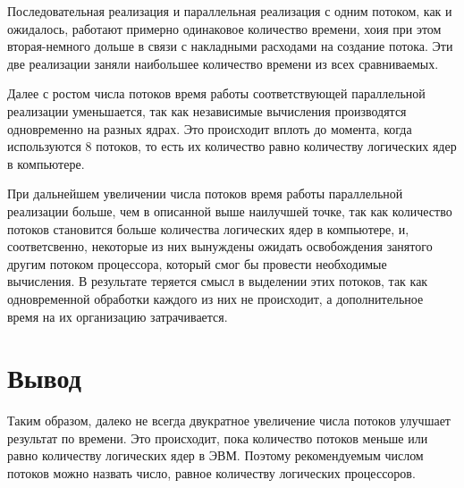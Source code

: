 Последовательная реализация и параллельная реализация с одним потоком, как и ожидалось, работают примерно одинаковое количество времени, хоия при этом вторая-немного дольше в связи с накладными расходами на создание потока. Эти две реализации заняли наибольшее количество времени из всех сравниваемых.

Далее с ростом числа потоков время работы соответствующей параллельной реализации уменьшается, так как независимые вычисления производятся одновременно на разных ядрах. Это происходит вплоть до момента, когда используются 8 потоков, то есть их количество равно количеству логических ядер в компьютере.

При дальнейшем увеличении числа потоков время работы параллельной реализации больше, чем в описанной выше наилучшей точке, так как количество потоков становится больше количества логических ядер в компьютере, и, соответсвенно, некоторые из них вынуждены ожидать освобождения занятого другим потоком процессора, который смог бы провести необходимые вычисления. В результате теряется смысл в выделении этих потоков, так как одновременной обработки каждого из них не происходит, а дополнительное время на их организацию затрачивается.



\section*{Вывод}

Таким образом, далеко не всегда двукратное увеличение числа потоков улучшает результат по времени. Это происходит, пока количество потоков меньше или равно количеству логических ядер в ЭВМ. Поэтому рекомендуемым числом потоков можно назвать число, равное количеству логических процессоров.
